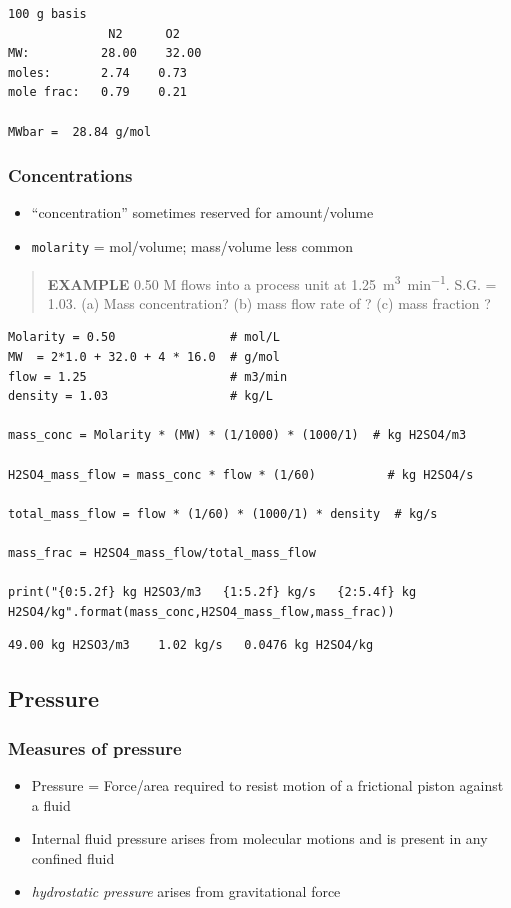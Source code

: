 \documentclass[11pt]{article}
\begin{document}
\begin{verbatim}
100 g basis
              N2      O2
MW:          28.00    32.00
moles:       2.74    0.73
mole frac:   0.79    0.21

MWbar =  28.84 g/mol
\end{verbatim}

\subsubsection{Concentrations}
\label{sec-4-5-3}
\begin{itemize}
\item ``concentration'' sometimes reserved for amount/volume
\item \texttt{molarity} = mol/volume; mass/volume less common
\end{itemize}

\begin{quote}
\textbf{EXAMPLE} 0.50 M  flows into a process unit at \SI{1.25}{\meter\cubed\per\minute}.  S.G. = 1.03.  (a) Mass concentration? (b) mass flow rate of ? (c) mass fraction ?
\end{quote}

\begin{verbatim}
Molarity = 0.50                # mol/L
MW  = 2*1.0 + 32.0 + 4 * 16.0  # g/mol
flow = 1.25                    # m3/min
density = 1.03                 # kg/L

mass_conc = Molarity * (MW) * (1/1000) * (1000/1)  # kg H2SO4/m3

H2SO4_mass_flow = mass_conc * flow * (1/60)          # kg H2SO4/s

total_mass_flow = flow * (1/60) * (1000/1) * density  # kg/s

mass_frac = H2SO4_mass_flow/total_mass_flow

print("{0:5.2f} kg H2SO3/m3   {1:5.2f} kg/s   {2:5.4f} kg H2SO4/kg".format(mass_conc,H2SO4_mass_flow,mass_frac))
\end{verbatim}
\begin{verbatim}
49.00 kg H2SO3/m3    1.02 kg/s   0.0476 kg H2SO4/kg
\end{verbatim}

\subsection{Pressure}
\label{sec-4-6}
\subsubsection{Measures of pressure}
\label{sec-4-6-1}
\begin{itemize}
\item Pressure = Force/area required to resist motion of a frictional piston against a fluid
\item Internal fluid pressure arises from molecular motions and is present in any confined fluid
\item \emph{hydrostatic pressure} arises from gravitational force
\end{itemize}
\end{document}
